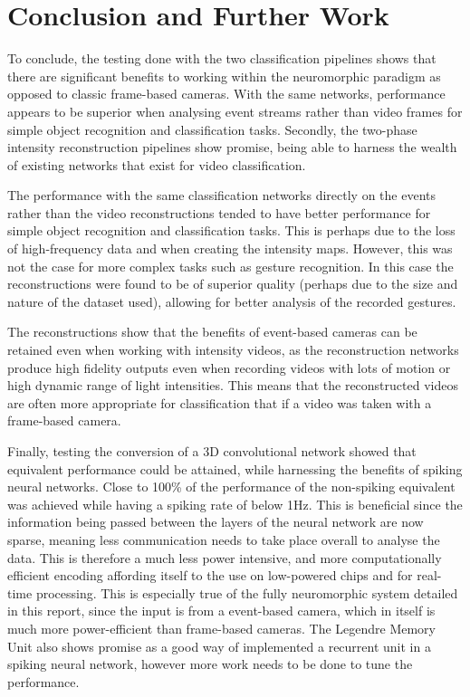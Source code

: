 \chapter{Conclusion and Further Work} \label{chap:conclusion_and_further_work}

To conclude, the testing done with the two classification pipelines shows that there are significant benefits to working within the neuromorphic paradigm as opposed to classic frame-based cameras. With the same networks, performance appears to be superior when analysing event streams rather than video frames for simple object recognition and classification tasks. Secondly, the two-phase intensity reconstruction pipelines show promise, being able to harness the wealth of existing networks that exist for video classification. 

The performance with the same classification networks directly on the events rather than the video reconstructions tended to have better performance for simple object recognition and classification tasks. This is perhaps due to the loss of high-frequency data and when creating the intensity maps. However, this was not the case for more complex tasks such as gesture recognition. In this case the reconstructions were found to be of superior quality (perhaps due to the size and nature of the dataset used), allowing for better analysis of the recorded gestures. 

The reconstructions show that the benefits of event-based cameras can be retained even when working with intensity videos, as the reconstruction networks produce high fidelity outputs even when recording videos with lots of motion or high dynamic range of light intensities. This means that the reconstructed videos are often more appropriate for classification that if a video was taken with a frame-based camera. 

Finally, testing the conversion of a 3D convolutional network showed that equivalent performance could be attained, while harnessing the benefits of spiking neural networks. Close to 100\% of the performance of the non-spiking equivalent was achieved while having a spiking rate of below 1Hz. This is beneficial since the information being passed between the layers of the neural network are now sparse, meaning less communication needs to take place overall to analyse the data. This is therefore a much less power intensive, and more computationally efficient encoding affording itself to the use on low-powered chips and for real-time processing. This is especially true of the fully neuromorphic system detailed in this report, since the input is from a event-based camera, which in itself is much more power-efficient than frame-based cameras. The Legendre Memory Unit also shows promise as a good way of implemented a recurrent unit in a spiking neural network, however more work needs to be done to tune the performance.

